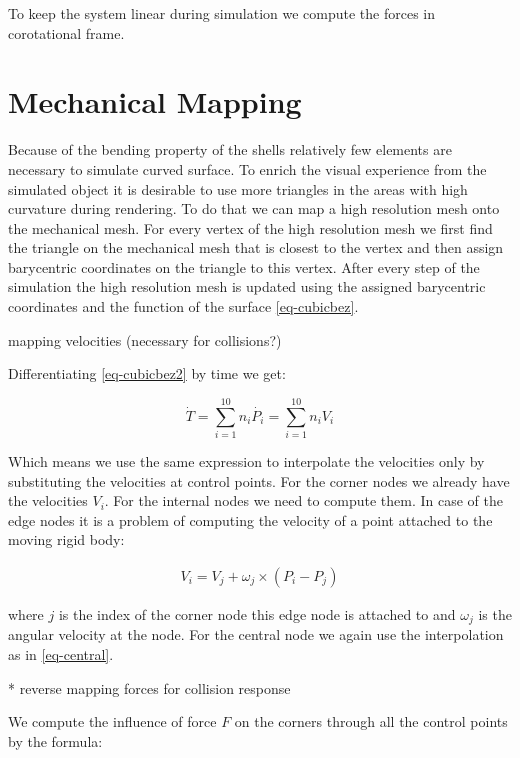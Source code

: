 \documentclass{egpubl}
\begin{document}
To keep the system linear during simulation we compute the forces in
corotational frame.


\section{Mechanical Mapping} %


Because of the bending property of the shells relatively few elements are
necessary to simulate curved surface. To enrich the visual experience from
the simulated object it is desirable to use more triangles in the areas
with high curvature during rendering. To do that we can map a high
resolution mesh onto the mechanical mesh. For every vertex of the high
resolution mesh we first find the triangle on the mechanical mesh that is
closest to the vertex and then assign barycentric coordinates on the
triangle to this vertex. After every step of the simulation the high
resolution mesh is updated using the assigned barycentric coordinates and
the function of the surface \eqref{eq-cubicbez}.

mapping velocities (necessary for collisions?)


Differentiating \eqref{eq-cubicbez2} by time we get:

\begin{equation}
    \dot{T} = \sum_{i=1}^{10} n_i \dot{P_i} = \sum_{i=1}^{10} n_i V_i
\end{equation}

Which means we use the same expression to interpolate the velocities only
by substituting the velocities at control points. For the corner nodes we
already have the velocities $V_i$. For the internal nodes we need to compute
them. In case of the edge nodes it is a problem of computing the velocity
of a point attached to the moving rigid body:

\begin{eqnarray}
    V_i = V_j + \omega_j \times (P_i - P_j)
\end{eqnarray}

where $j$ is the index of the corner node this edge node is attached to and
$\omega_j$ is the angular velocity at the node. For the central node we
again use the interpolation as in \eqref{eq-central}.

* reverse mapping forces for collision response

We compute the influence of force $F$ on the corners through all the
control points by the formula:
\end{document}
